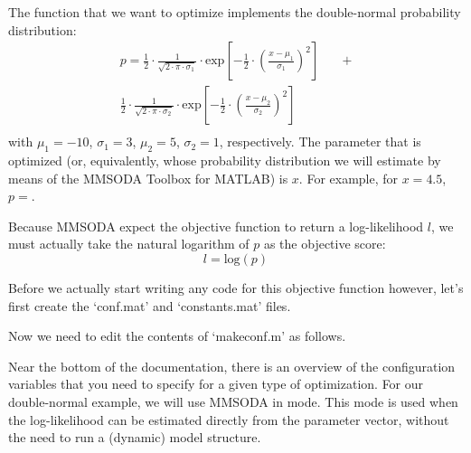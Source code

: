 
The function that we want to optimize implements the double-normal probability distribution:
\begin{equation}\label{eq:double-normal}
\begin{align}
p=\frac{1}{2}\cdot{}\frac{1}{\sqrt{2\cdot{}\pi\cdot{}\sigma{}_1}}\cdot{}\mathrm{exp}\left[-\frac{1}{2}\cdot{}\left(\frac{x-\mu_1}{\sigma_1} \right)^2 \right] \quad & + \\
\frac{1}{2}\cdot{}\frac{1}{\sqrt{2\cdot{}\pi\cdot{}\sigma{}_2}}\cdot{}\mathrm{exp}\left[-\frac{1}{2}\cdot{}\left(\frac{x-\mu_2}{\sigma_2} \right)^2 \right] \quad & \\
\end{align}
\end{equation}
with $\mu_1 = -10$, $\sigma_1 = 3$, $\mu_2 = 5$, $\sigma_2 = 1$, respectively. The parameter that is optimized (or, equivalently, whose probability distribution we will estimate by means of the MMSODA Toolbox for MATLAB) is $x$. For example, for $x=4.5$, $p = $.

Because MMSODA expect the objective function to return a log-likelihood $l$, we must actually take the natural logarithm of $p$ as the objective score:
\begin{equation}\label{eq:log-likelihood}
l=\mathrm{log}\left(p\right)
\end{equation}

Before we actually start writing any code for this objective function however, let's first create the `conf.mat' and `constants.mat' files.



Now we need to edit the contents of `makeconf.m' as follows.


Near the bottom of the documentation, there is an overview of the configuration variables that you need to specify for a given type of optimization. For our double-normal example, we will use MMSODA in  mode. This mode is used when the log-likelihood can be estimated directly from the parameter vector, without the need to run a (dynamic) model structure.

